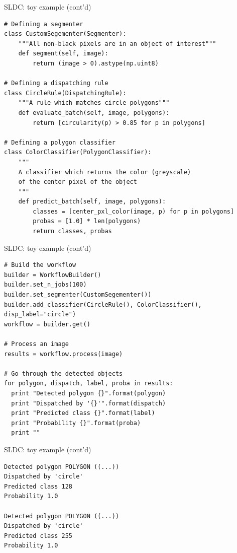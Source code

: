 \documentclass{beamer}
\begin{document}
\begin{frame}[fragile]{SLDC: toy example (cont'd)}
\begin{verbatim}
# Defining a segmenter
class CustomSegementer(Segmenter):
    """All non-black pixels are in an object of interest"""
    def segment(self, image):
        return (image > 0).astype(np.uint8)
        
# Defining a dispatching rule 
class CircleRule(DispatchingRule):
    """A rule which matches circle polygons"""
    def evaluate_batch(self, image, polygons):
        return [circularity(p) > 0.85 for p in polygons]

# Defining a polygon classifier
class ColorClassifier(PolygonClassifier):
    """
    A classifier which returns the color (greyscale) 
    of the center pixel of the object
    """
    def predict_batch(self, image, polygons):
        classes = [center_pxl_color(image, p) for p in polygons]
        probas = [1.0] * len(polygons)
        return classes, probas
\end{verbatim}
\end{frame}

\begin{frame}[fragile]{SLDC: toy example (cont'd)}
\begin{verbatim}
# Build the workflow
builder = WorkflowBuilder()
builder.set_n_jobs(100)
builder.set_segmenter(CustomSegementer())
builder.add_classifier(CircleRule(), ColorClassifier(), disp_label="circle")
workflow = builder.get()

# Process an image
results = workflow.process(image)

# Go through the detected objects
for polygon, dispatch, label, proba in results:
  print "Detected polygon {}".format(polygon)
  print "Dispatched by '{}'".format(dispatch)
  print "Predicted class {}".format(label)
  print "Probability {}".format(proba)
  print ""
\end{verbatim}
\end{frame}

\begin{frame}[fragile]{SLDC: toy example (cont'd)}
\begin{verbatim}
Detected polygon POLYGON ((...))
Dispatched by 'circle'
Predicted class 128
Probability 1.0

Detected polygon POLYGON ((...))
Dispatched by 'circle'
Predicted class 255
Probability 1.0
\end{verbatim}
\end{frame}
\end{document}
